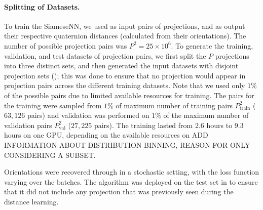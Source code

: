 \paragraph{Splitting of Datasets.}
To train the SiameseNN, we used as input pairs of projections, and as output their respective quaternion distances (calculated from their orientations).
The number of possible projection pairs was $P^2 = 25 \times 10^6$. To generate the training, validation, and test datasets of projection pairs, we first split the $P$ projections into three distinct sets, and then generated the input datasets with disjoint projection sets (); this was done to ensure that no projection would appear in projection pairs across the different training datasets.
Note that we used only $1\%$ of the possible pairs due to limited available resources for training.
 The pairs for the training were sampled from $1\%$ of maximum number of training pairs $P_{\text{train}}^2$ ($63,126$ pairs) and validation was performed on $1\%$ of the maximum number of validation pairs $P_{\text{val}}^2$ ($27,225$ pairs).  The training lasted from 2.6 hours to 9.3 hours on one GPU, depending on the available resources on  ADD INFORMATION ABOUT DISTRIBUTION BINNING, REASON FOR ONLY CONSIDERING A SUBSET. 

Orientations were recovered through  in a stochastic setting, with the loss function varying over the batches. The algorithm was deployed on the test set in  to ensure that it did not include any projection that was previously seen during the distance learning.


